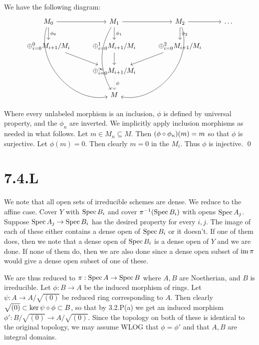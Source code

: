 \documentclass{article}
\begin{document}
We have the following diagram:
\begin{equation*}
    \begin{tikzcd}
        M_0 \arrow[r] \arrow[d, "\phi_0"] \arrow[rddd, bend right=60] & M_1 \arrow[r] \arrow[d, "\phi_1"] \arrow[ddd, bend right] & M_2 \arrow[r] \arrow[d, "\phi_2"] \arrow[lddd, bend left=60] & \dots \\
        \oplus_{i=0}^0 M_{i+1}/M_i \arrow[rd]                         & \oplus_{i=0}^1 M_{i+1}/M_i \arrow[d]                      & \oplus_{i=0}^2 M_{i+1}/M_i \arrow[ld]                        &       \\
                                                                      & \oplus_{i=0}^\infty M_{i+1}/M_i \arrow[d, "\phi", dotted] &                                                              &       \\
                                                                      & M                                                         &                                                              &
    \end{tikzcd}
\end{equation*}
Where every unlabeled morphism is an inclusion, $\phi$ is
defined by universal property, and the $\phi_n$ are inverted. We
implicitly apply inclusion morphisms as needed in what follows. Let
$m \in M_n \subseteq M$. Then $(\phi \circ \phi_n)(m)=m$ so that
$\phi$ is surjective. Let $\phi(m)=0$. Then
clearly $m=0$ in the $M_i$. Thus
$\phi$ is injective. \qed

\section{7.4.L}
We note that all open sets of irreducible schemes are dense. We reduce to the
affine case. Cover $Y$ with $\operatorname{Spec} B_i$ and
cover $\pi^{-1}(\operatorname{Spec} B_i)$ with opens $\operatorname{Spec} A_j$. Suppose
$\operatorname{Spec} A_j \to \operatorname{Spec} B_i$ has the desired property for every
$i, j$. The image of each of these either contains a dense
open of $\operatorname{Spec} B_i$ or it doesn't. If one of them does, then we
note that a dense open of $\operatorname{Spec} B_i$ is a dense open of
$Y$ and we are done. If none of them do, then we are also
done since a dense open subset of $\operatorname{im} \pi$ would give a dense
open subset of one of these.

We are thus reduced to $\pi: \operatorname{Spec} A \to \operatorname{Spec} B$ where $A, B$
are Noetherian, and $B$ is irreducible. Let
$\phi: B \to A$ be the induced morphism of rings. Let
$\psi: A \to A/\sqrt{(0)}$ be reduced ring corresponding to
$A$. Then clearly $\sqrt{(0)} \subset \ker \psi \circ \phi \subset B$, so that by
3.2.P(a) we get an induced morphism $\phi': B/\sqrt{(0)} \to A/\sqrt{(0)}$. Since the topology
on both of these is identical to the original topology, we may assume WLOG that
$\phi=\phi'$ and that $A, B$ are integral domains.
\end{document}

